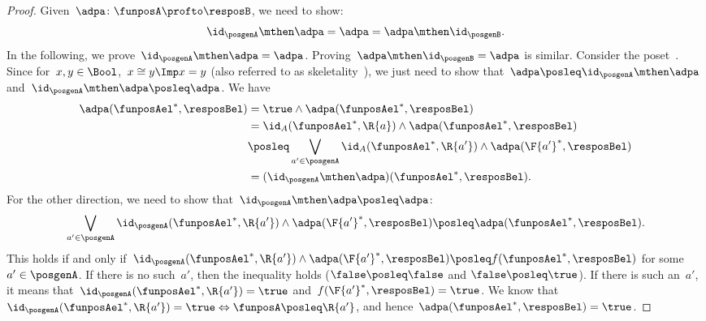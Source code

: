 \begin{proof}
    Given~$\adpa\colon \funposA\profto \resposB$, we need to show:
    \begin{equation*}
        \id_\posgenA \mthen \adpa= \adpa = \adpa\mthen \id_\posgenB.
    \end{equation*}
    In the following, we prove~$\id_\posgenA \mthen \adpa = \adpa$.
    Proving~$\adpa\mthen \id_\posgenB=\adpa$ is similar.
    Consider the poset~\Bool. Since for~$x,y\in \Bool$,~$x\cong y \Imp x=y$ (also referred to as skeletality~\cite{fong2019}), we just need to show that~$\adpa\posleq \id_\posgenA\mthen \adpa$ and~$\id_\posgenA\mthen \adpa\posleq \adpa$.
    We have
    \begin{equation*}
        \label{eq:dp_unit_1}
        \begin{aligned}
            \adpa(\funposAel^*,\resposBel)&=\true \wedge \adpa(\funposAel^*,\resposBel)\\
            &= \id_A(\funposAel^*,\R{a}) \wedge \adpa(\funposAel^*,\resposBel)\\
            &\posleq \bigvee_{a'\in \posgenA}\id_A(\funposAel^*,\R{a'})\wedge \adpa(\F{a'}^*,\resposBel)\\
            &=(\id_\posgenA\mthen \adpa)(\funposAel^*,\resposBel).
        \end{aligned}
    \end{equation*}
    For the other direction, we need to show that~$\id_\posgenA\mthen \adpa\posleq \adpa$:
    \begin{equation*}
        \label{eq:dp_unit_2}
        \bigvee_{a'\in \posgenA}\id_\posgenA(\funposAel^*,\R{a'})\wedge \adpa(\F{a'}^*,\resposBel) \posleq \adpa(\funposAel^*,\resposBel).
    \end{equation*}
    This holds if and only if~$\id_\posgenA(\funposAel^*,\R{a'})\wedge \adpa(\F{a'}^*,\resposBel) \posleq f(\funposAel^*,\resposBel)$ for some~$a'\in \posgenA$.
    If there is no such~$a'$, then the inequality holds ($\false \posleq \false$ and $\false \posleq \true$).
    If there is such an~$a'$, it means that~$\id_\posgenA(\funposAel^*,\R{a'})=\true$ and~$f(\F{a'}^*,\resposBel)=\true$.
    We know that~$\id_\posgenA(\funposAel^*,\R{a'})=\true \Leftrightarrow \funposA\posleq \R{a'}$, and hence~$\adpa(\funposAel^*,\resposBel)=\true$.
\end{proof}
